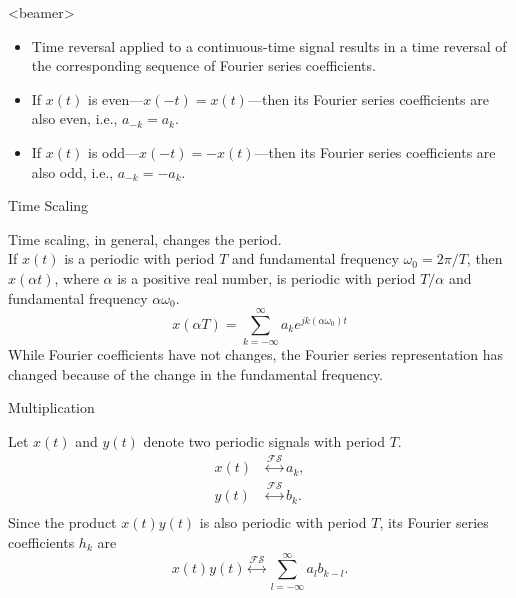 \begin{frame}<beamer>
    \begin{itemize}[<+->]
      \item Time reversal applied to a continuous-time signal results in a time reversal of the corresponding sequence of Fourier series coefficients.
      \item If $x(t)$ is even---$x(-t) = x(t)$---then its Fourier series coefficients are also even, i.e., $a_{-k}=a_k$.
      \item If $x(t)$ is odd---$x(-t) = -x(t)$---then its Fourier series coefficients are also odd, i.e., $a_{-k}=-a_k$.
    \end{itemize}
\end{frame}


\begin{frame}{Time Scaling}
    {
        Time scaling, in general, changes the period.\\
        If $x(t)$ is a periodic with period $T$ and fundamental frequency $\omega_0 = 2\pi/T$, then $x(\alpha t)$, where $\alpha$ is a positive real number, is periodic with period $T/\alpha$ and fundamental frequency $\alpha \omega_0$.
        \begin{equation}
            x(\alpha T) = \sum_{k=-\infty}^{\infty} a_k e^{jk(\alpha \omega_0)t}
        \end{equation}
        While Fourier coefficients have not changes, the Fourier series representation \alert{has} changed because of the change in the fundamental frequency.

    }
\end{frame}


\begin{frame}{Multiplication}
    {
        Let $x(t)$ and $y(t)$ denote two periodic signals with period $T$.
        \begin{align*}
            x(t) &\overset{\mathcal{FS}}{\longleftrightarrow} a_k,\\
            y(t) &\overset{\mathcal{FS}}{\longleftrightarrow} b_k.\\
        \end{align*}
        Since the product $x(t)y(t)$ is also periodic with period $T$, its Fourier series coefficients $h_k$ are
        \begin{equation}
            x(t)y(t) \overset{\mathcal{FS}}{\longleftrightarrow} \sum_{l=-\infty}^{\infty}a_l b_{k-l}. 
        \end{equation}

    }
\end{frame}


